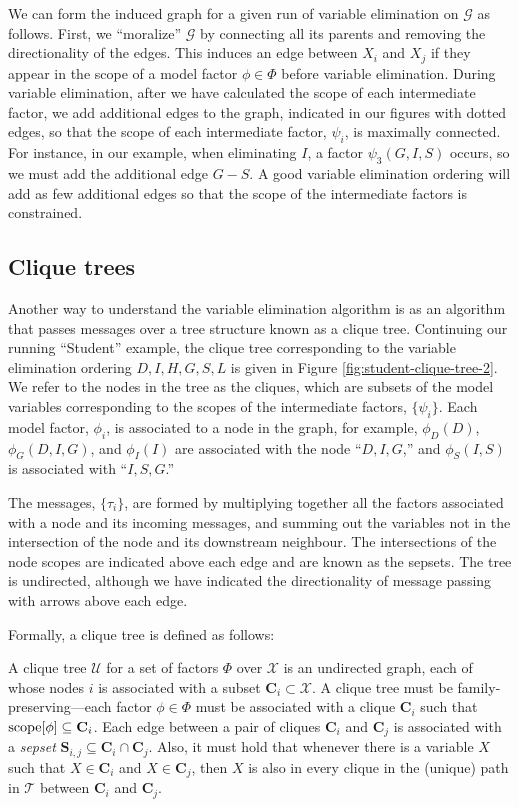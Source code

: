 \documentclass{article}
\begin{document}
  We can form the induced graph for a given run of variable elimination on $\mathcal{G}$ as follows.
  First, we ``moralize'' $\mathcal{G}$ by connecting all its parents and removing the directionality of the edges.
  This induces an edge between $X_i$ and $X_j$ if they appear in the scope of a model factor $\phi\in\Phi$ before variable elimination.
  During variable elimination, after we have calculated the scope of each intermediate factor, we add additional edges to the graph, indicated in our figures with dotted edges, so that the scope of each intermediate factor, $\psi_i$, is maximally connected.
  For instance, in our example, when  eliminating $I$, a factor $\psi_3(G,I,S)$ occurs, so we must add the additional edge $G-S$.
  A good variable elimination ordering will add as few additional edges so that the scope of the intermediate factors is constrained.

\subsection{Clique trees}\label{sec:clique-trees}

Another way to understand the variable elimination algorithm is as an algorithm that passes messages over a tree structure known as a clique tree.
Continuing our running ``Student'' example, the clique tree corresponding to the variable elimination ordering $D,I,H,G,S,L$ is given in Figure \ref{fig:student-clique-tree-2}.
We refer to the nodes in the tree as the cliques, which are subsets of the model variables corresponding to the scopes of the intermediate factors, $\{\psi_i\}$.
Each model factor, $\phi_i$, is associated to a node in the graph, for example, $\phi_D(D)$, $\phi_G(D,I,G)$, and $\phi_I(I)$ are associated with the node ``$D,I,G$,'' and $\phi_S(I,S)$ is associated with ``$I,S,G$.''

The messages, $\{\tau_i\}$, are formed by multiplying together all the factors associated with a node and its incoming messages, and summing out the variables not in the intersection of the node and its downstream neighbour.
The intersections of the node scopes are indicated above each edge and are known as the sepsets.
The tree is undirected, although we have indicated the directionality of message passing with arrows above each edge.

Formally, a clique tree is defined as follows:
\begin{definition}
	A clique tree $\mathcal{U}$ for a set of factors $\Phi$ over $\mathcal{X}$ is an undirected graph, each of whose nodes $i$ is associated with a subset $\mathbf{C}_i\subset\mathcal{X}$.
A clique tree must be family-preserving---each factor $\phi\in\Phi$ must be associated with a clique $\mathbf{C}_i$ such that $\textnormal{scope}[\phi]\subseteq\mathbf{C}_i$.
Each edge between a pair of cliques $\mathbf{C}_i$ and $\mathbf{C}_j$ is associated with a \emph{sepset} $\mathbf{S}_{i,j}\subseteq \mathbf{C}_i\cap\mathbf{C}_j$.
Also, it must hold that whenever there is a variable $X$ such that $X\in\mathbf{C}_i$ and $X\in\mathbf{C}_j$, then $X$ is also in every clique in the (unique) path in $\mathcal{T}$ between $\mathbf{C}_i$ and $\mathbf{C}_j$.
\end{definition}
\end{document}
